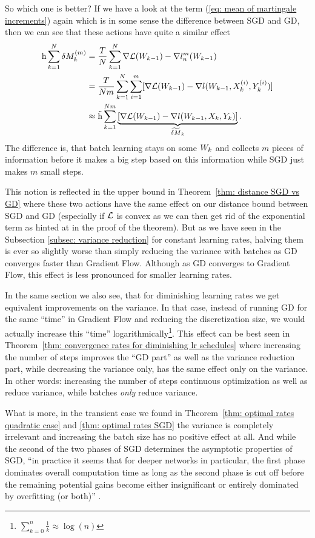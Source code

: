 So which one is better?  If we have a look at the term (\ref{eq: mean of
martingale increments}) again which is in some sense the difference between SGD
and GD, then we can see that these actions have quite a similar effect
\begin{align*}
	\text{h}\sum_{k=1}^N\delta M_k^{(m)}
	&=\frac{T}{N}\sum_{k=1}^N
	\nabla\mathcal{L}(W_{k-1})- \nabla l_n^m(W_{k-1})\\
	&=\frac{T}{Nm}\sum_{k=1}^N\sum_{i=1}^m
	[\nabla\mathcal{L}(W_{k-1})-\nabla l(W_{k-1},X^{(i)}_k, Y^{(i)}_k)]\\
	&\approx \tilde{\text{h}} \sum_{k=1}^{Nm}
	\underbrace{
		[\nabla\mathcal{L}(W_{k-1})-\nabla l(W_{k-1},X_k, Y_k)]
	}_{\widetilde{\delta M}_k}.
\end{align*}
The difference is, that batch learning stays on some \(W_k\) and collects
\(m\) pieces of information before it makes a big step based on this information
while SGD just makes \(m\) small steps.

This notion is reflected in the upper bound in Theorem~\ref{thm: distance SGD vs
GD} where these two actions have the same effect on our distance bound between SGD and
GD (especially if \(\mathcal{L}\) is convex as we can then get rid of the exponential
term as hinted at in the proof of the theorem). But as we have seen in the
Subsection \ref{subsec: variance reduction} for constant learning rates, halving
them is ever so slightly worse than simply reducing the variance
with batches as GD converges faster than Gradient Flow. Although as GD converges
to Gradient Flow, this effect is less pronounced for smaller learning rates.

In the same section we also see, that for diminishing learning rates we get
equivalent improvements on the variance.
In that case, instead of running GD for the same ``time'' in Gradient Flow and
reducing the discretization size, we would actually increase this ``time''
logarithmically\footnote{\(\sum_{k=0}^n\tfrac{1}{k}\approx\log(n)\)}. This effect
can be best seen in Theorem~\ref{thm: convergence rates for diminishing lr
schedules} where increasing the number of steps improves the ``GD part'' as well
as the variance reduction part, while decreasing the variance only, has the same
effect only on the variance. In other words: increasing the number of steps
continuous optimization as well as reduce variance, while batches \emph{only}
reduce variance.

What is more, in the transient case we found in Theorem~\ref{thm:
optimal rates quadratic case} and \ref{thm: optimal rates SGD} the variance is
completely irrelevant and increasing the batch size has no positive effect at
all. And while the second of the two phases of SGD \parencite[first observed
by][]{darkenFasterStochasticGradient1991} determines the asymptotic properties
of SGD,  ``in practice it seems that for deeper networks in particular, the first
phase dominates overall computation time as long as the second phase is cut off
before the remaining potential gains become either insignificant or entirely
dominated by overfitting (or both)''  
\parencite{sutskeverImportanceInitializationMomentum2013}.


